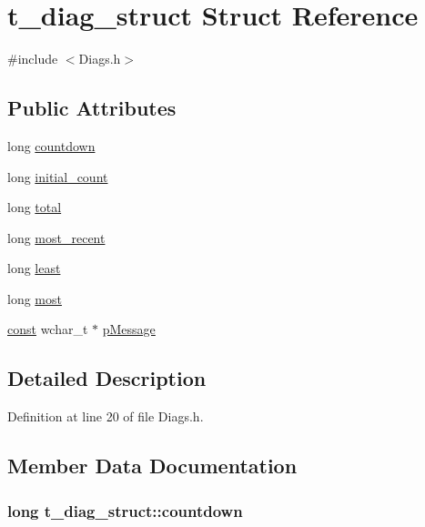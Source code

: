 \hypertarget{structt__diag__struct}{}\section{t\+\_\+diag\+\_\+struct Struct Reference}
\label{structt__diag__struct}


{\ttfamily \#include $<$Diags.\+h$>$}

\subsection*{Public Attributes}
\begin{DoxyCompactItemize}
\item 
long \hyperlink{structt__diag__struct_a47070c498de3c6162342852aa1292add}{countdown}
\item 
long \hyperlink{structt__diag__struct_a5464ee332d79d5bc6409b817ea73c260}{initial\+\_\+count}
\item 
long \hyperlink{structt__diag__struct_ade92ff5efbb9b559dd592f5eb60135df}{total}
\item 
long \hyperlink{structt__diag__struct_a1d14246bf193d4f771d099626c3384ae}{most\+\_\+recent}
\item 
long \hyperlink{structt__diag__struct_a0ba6e05b3a388401bfc4efd33260a977}{least}
\item 
long \hyperlink{structt__diag__struct_a9f3236da1b87b126687573ce17b39a3d}{most}
\item 
\hyperlink{getopt1_8c_a2c212835823e3c54a8ab6d95c652660e}{const} wchar\+\_\+t $\ast$ \hyperlink{structt__diag__struct_a562d49216f7ee3919f9525553b76f9fd}{p\+Message}
\end{DoxyCompactItemize}


\subsection{Detailed Description}


Definition at line 20 of file Diags.\+h.



\subsection{Member Data Documentation}
\subsubsection[{\texorpdfstring{countdown}{countdown}}]{\setlength{\rightskip}{0pt plus 5cm}long t\+\_\+diag\+\_\+struct\+::countdown}\hypertarget{structt__diag__struct_a47070c498de3c6162342852aa1292add}{}\label{structt__diag__struct_a47070c498de3c6162342852aa1292add}


